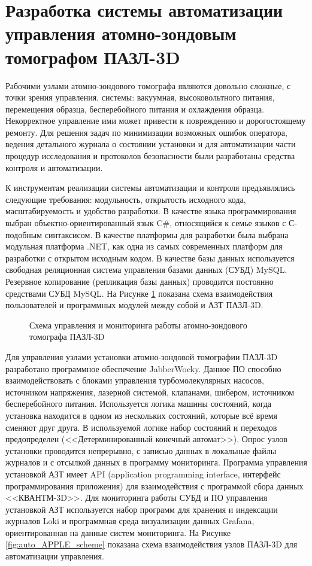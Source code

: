\FloatBarrier
\section{Разработка системы автоматизации управления атомно-зондовым томографом ПАЗЛ-3D}\label{sec:ch2/sec6}

Рабочими узлами атомно-зондового томографа являются довольно сложные, с точки зрения управления, системы: вакуумная, высоковольтного питания, перемещения образца, бесперебойного питания и охлаждения образца. Некорректное управление ими может привести к повреждению и дорогостоящему ремонту. Для решения задач по минимизации возможных ошибок оператора, ведения детального журнала о состоянии установки и для автоматизации части процедур исследования и протоколов безопасности были разработаны средства контроля и автоматизации. 

К инструментам реализации системы автоматизации и контроля предъявлялись следующие требования: модульность, открытость исходного кода, масштабируемость и удобство разработки. В качестве языка программирования выбран объектно-ориентированный язык C$\#$, относящийся к семье языков с С-подобным синтаксисом. В качестве платформы для разработки была выбрана модульная платформа .NET, как одна из самых современных платформ для разработки с открытом исходным кодом. В качестве базы данных используется свободная реляционная система управления базами данных (СУБД) MySQL. Резервное копирование (репликация базы данных) проводится постоянно средствами СУБД MySQL. На Рисунке \cref{fig:auto_APPLE_manage}  показана схема взаимодействия пользователей и программных модулей между собой и АЗТ ПАЗЛ-3D.

\begin{figure}[htb]
	\caption{Схема управления и мониторинга работы атомно-зондового томографа ПАЗЛ-3D}
	\label{fig:auto_APPLE_manage}
\end{figure}

Для управления узлами установки атомно-зондовой томографии ПАЗЛ-3D разработано программное обеспечение JabberWocky. Данное ПО способно взаимодействовать с блоками управления турбомолекулярных насосов, источником напряжения, лазерной системой, клапанами, шибером, источником бесперебойного питания. Используется логика машины состояний, когда установка находится в одном из нескольких состояний, которые всё время сменяют друг друга. В используемой логике набор состояний и переходов предопределен (<<Детерминированный конечный автомат>>). Опрос узлов установки проводится непрерывно, с записью данных в локальные файлы журналов и с отсылкой данных в программу мониторинга. Программа управления установкой АЗТ имеет API (application programming interface, интерфейс программирования приложения) для взаимодействия с программой сбора данных <<КВАНТМ-3D>>. Для мониторинга работы СУБД и ПО управления установкой АЗТ используется набор программ для хранения и индексации журналов Loki и  программная среда визуализации данных Grafana, ориентированная на данные систем мониторинга. На Рисунке \cref{fig:auto_APPLE_scheme} показана схема взаимодействия узлов ПАЗЛ-3D для автоматизации управления.

